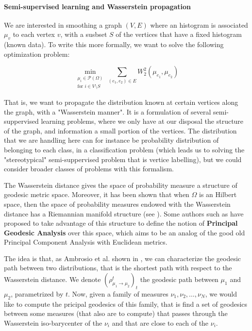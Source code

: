 \paragraph{Semi-supervised learning and Wasserstein propagation}

We are interested in smoothing a graph $(V,E)$ where an histogram is associated
$\mu_v$ to each vertex $v$, with a susbset $S$ of the vertices that have a
fixed histogram (known data). To write this more formally, we want to solve
the following optimization problem:

$$
    \underset{\substack{\mu_i \in \mathcal{P}\left(\Omega\right) \\ \text{for }i \in V\setminus S}}\min \sum_{(e_1, e_2) \in E} W_2^2\left(\mu_{e_1}, \mu_{e_2}\right)
$$

That is, we want to propagate the distribution known at certain vertices
along the graph, with a "Wasserstein manner". It is a formulation of several
semi-suppervised learning problems, where we only have at our disposal the
structure of the graph, and information a small portion of the vertices. The
distribution that we are handling here can for instance be probability
distribution of belonging to each class, in a classification problem (which
leads us to solving the "stereotypical" semi-suppervised problem that is
vertice labelling), but we could consider broader classes of problems with
this formalism.


The Wasserstein distance gives the space of probability measure a structure
of geodesic metric space. Moreover, it has been shown that when $\Omega$
is an Hilbert space, then the space of probability measures endowed
with the Wasserstein distance has a Riemannian manifold structure (see
\cite{ambrosio2008gradient}). Some authors such as \cite{seguy2015principal}
have proposed to take advantage of this structure to define the notion of
\textbf{Principal Geodesic Analysis} over this space, which aims to be an
analog of the good old Principal Component Analysis with Euclidean metrics.

The idea is that, as Ambrosio et al. shown in \cite{ambrosio2008gradient},
we can characterize the geodesic path between two distributions, that is
the shortest path with respect to the Wasserstein distance. We denote
$(\rho_{\mu_1 \to \mu_2}^t)_t$ the geodesic path between $\mu_1$ and $\mu_2$,
parametrized by $t$. Now, given a family of measures $\nu_1, \nu_2, \dots,
\nu_N$, we would like to compute the pricipal geodesics of this family, that
is find a set of geodesics between some measures (that also are to compute)
that passes through the Wasserstein iso-barycenter of the $\nu_i$ and that
are close to each of the $\nu_i$.

